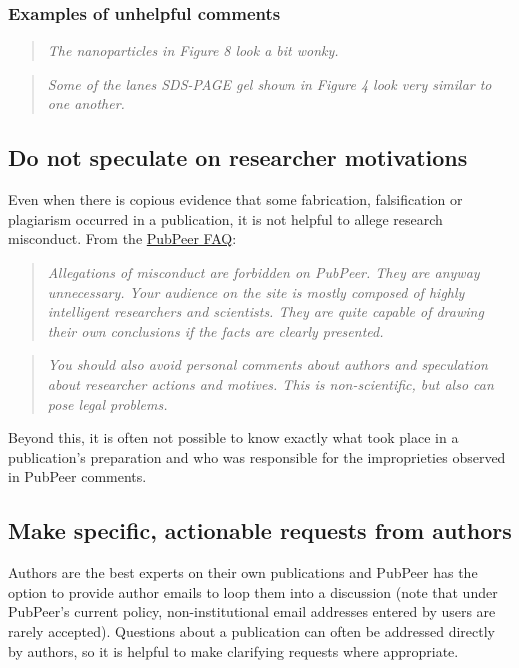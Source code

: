 \documentclass[letterpaper, 12pt]{article}
\begin{document}
\subsubsection*{Examples of unhelpful comments}

\begin{quote}
    \textit{The nanoparticles in Figure 8 look a bit wonky.}
\end{quote}

\begin{quote}
    \textit{Some of the lanes SDS-PAGE gel shown in Figure 4 look very similar to one another.}
\end{quote}

\subsection*{Do not speculate on researcher motivations}

Even when there is copious evidence that some fabrication, falsification or plagiarism occurred in a publication, it is not helpful to allege research misconduct. From the \href{https://pubpeer.com/static/faq#4}{PubPeer FAQ}:

\begin{quote}
    \textit{Allegations of misconduct are forbidden on PubPeer. They are anyway unnecessary. Your audience on the site is mostly composed of highly intelligent researchers and scientists. They are quite capable of drawing their own conclusions if the facts are clearly presented.}
\end{quote}

\begin{quote}
    \textit{You should also avoid personal comments about authors and speculation about researcher actions and motives. This is non-scientific, but also can pose legal problems.}
\end{quote}

Beyond this, it is often not possible to know exactly what took place in a publication's preparation and who was responsible for the improprieties observed in PubPeer comments.

\subsection*{Make specific, actionable requests from authors}

Authors are the best experts on their own publications and PubPeer has the option to provide author emails to loop them into a discussion (note that under PubPeer's current policy, non-institutional email addresses entered by users are rarely accepted). Questions about a publication can often be addressed directly by authors, so it is helpful to make clarifying requests where appropriate.
\end{document}
